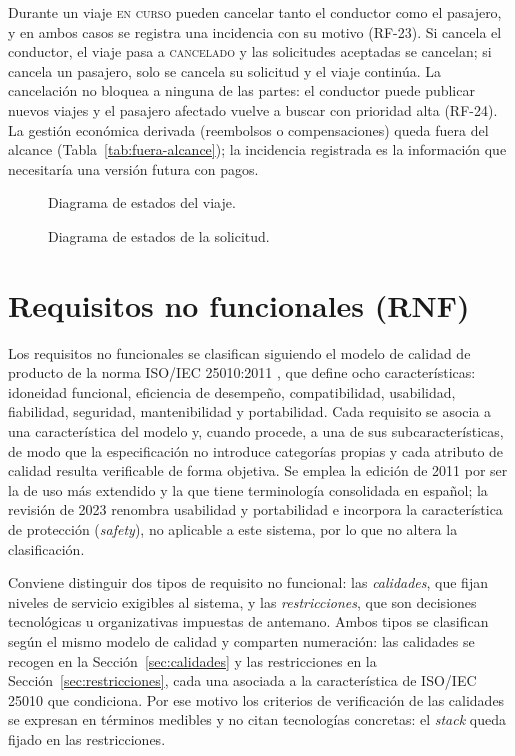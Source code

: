 Durante un viaje \textsc{en curso} pueden cancelar tanto el conductor como el pasajero, y en ambos casos se registra una incidencia con su motivo (RF-23). Si cancela el conductor, el viaje pasa a \textsc{cancelado} y las solicitudes aceptadas se cancelan; si cancela un pasajero, solo se cancela su solicitud y el viaje continúa. La cancelación no bloquea a ninguna de las partes: el conductor puede publicar nuevos viajes y el pasajero afectado vuelve a buscar con prioridad alta (RF-24). La gestión económica derivada (reembolsos o compensaciones) queda fuera del alcance (Tabla~\ref{tab:fuera-alcance}); la incidencia registrada es la información que necesitaría una versión futura con pagos.

\begin{figure}[H]
  \centering
  
  \caption{Diagrama de estados del viaje.}
  \label{fig:estado-viaje}
\end{figure}

\begin{figure}[H]
  \centering
  
  \caption{Diagrama de estados de la solicitud.}
  \label{fig:estado-solicitud}
\end{figure}

\section{Requisitos no funcionales (RNF)}
\label{sec:rnf}

Los requisitos no funcionales se clasifican siguiendo el modelo de calidad de producto de la norma ISO/IEC 25010:2011 \cite{ISO25010}, que define ocho características: idoneidad funcional, eficiencia de desempeño, compatibilidad, usabilidad, fiabilidad, seguridad, mantenibilidad y portabilidad. Cada requisito se asocia a una característica del modelo y, cuando procede, a una de sus subcaracterísticas, de modo que la especificación no introduce categorías propias y cada atributo de calidad resulta verificable de forma objetiva. Se emplea la edición de 2011 por ser la de uso más extendido y la que tiene terminología consolidada en español; la revisión de 2023 renombra usabilidad y portabilidad e incorpora la característica de protección (\textit{safety}), no aplicable a este sistema, por lo que no altera la clasificación.

Conviene distinguir dos tipos de requisito no funcional: las \emph{calidades}, que fijan niveles de servicio exigibles al sistema, y las \emph{restricciones}, que son decisiones tecnológicas u organizativas impuestas de antemano. Ambos tipos se clasifican según el mismo modelo de calidad y comparten numeración: las calidades se recogen en la Sección~\ref{sec:calidades} y las restricciones en la Sección~\ref{sec:restricciones}, cada una asociada a la característica de ISO/IEC 25010 que condiciona. Por ese motivo los criterios de verificación de las calidades se expresan en términos medibles y no citan tecnologías concretas: el \textit{stack} queda fijado en las restricciones.

